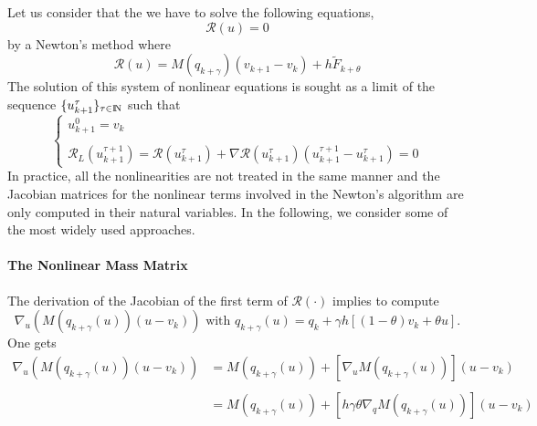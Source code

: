  Let us consider that the we have to solve the following equations,
\begin{equation}
  \label{eq:NL4}
  \mathcal R (u) = 0
\end{equation}
by a Newton's method where
\begin{equation}
  \label{eq:NL6}
    \mathcal R (u) =   M(q_{k+\gamma} ) (v_{k+1}-v_{k}) + h \tilde F_{k+\theta}
\end{equation}
 The solution of this system of nonlinear equations is sought as a limit of the sequence $\{ u^{\tau}_{k+1}\}_{\tau \in \mathrm{I\!N}}$ such that
 \begin{equation}
   \label{eq:NL7}
   \begin{cases}
     u^{0}_{k+1} = v_k \\ \\
     \mathcal R_L( u^{\tau+1}_{k+1}) =  \mathcal R (u^{\tau}_{k+1}) + \nabla \mathcal R (u^{\tau}_{k+1} )(u^{\tau+1}_{k+1}-u^{\tau}_{k+1} ) =0
 \end{cases}
\end{equation}
 In practice, all the nonlinearities are not treated in the same manner and the Jacobian matrices for the nonlinear terms involved in the Newton's algorithm are only computed in their natural variables. In the following, we consider some of the most widely used approaches.



\paragraph{The Nonlinear Mass Matrix}
The derivation of the Jacobian of the first term of  $\mathcal R (\cdot)$ implies to compute
\begin{equation}
  \label{eq:NL2000}
   \nabla_u  \left(M(q_{k+\gamma}(u) ) (u-v_{k})\right) \text{ with } q_{k+\gamma}(u) = q_k + \gamma h[(1-\theta) v_k+ \theta u].
\end{equation}
One gets
\begin{equation}
  \label{eq:NL8}
  \begin{array}{ll}
    \nabla_u  \left(M(q_{k+\gamma}(u) ) (u-v_{k})\right) &=   M(q_{k+\gamma}(u))  + \left[ \nabla_u M(q_{k+\gamma}(u) ) \right] (u-v_{k}) \\ \\
                                         &=    M(q_{k+\gamma}(u)) + \left[h \gamma\theta \nabla_{q} M(q_{k+\gamma}(u))\right]  (u-v_{k})
\end{array}
\end{equation}

